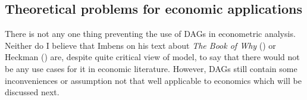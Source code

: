 \documentclass[main=english,12pt,a4paper,pdftex,econ,utf8]{aaltothesis}
\begin{document}
\begin{comment}
For other parts the only thing these articles are taking from DAG framework is the basic structure and way to present the structure which is completely comprehensible with the knowledge provided in the section \ref{section:overview} and equation \ref{eq:lmc}. Also the fact that these are only establishing Granger causality between variables, so analysis is just concentrated on correlations and thus none provides any economic usage of the identification tools that are associated with graphs nor any use for do-calculus. Also as it is not intended to measure actual causality these graphs could not fulfill the completeness requirement of CI in graphs. As an example the Selma Jaytech's paper is only using prince information of stocks and bonds from different countries as determining variables for other countries price variables. It of course could not be adequate model to make complete graph as the international asset markets are not some fully endogenous self defining system, but rather there is some exogenous factors that affecting the movements. All of this might very well be sufficient for the purpose of the study, but at the same time it is making these studies, from the standpoint of graphical models and CI, not that great of an examples for the use of theoretical framework of DAG CI in economics. In other words these papers are using DAGs just as a way to present models visually and the PC algorithm as statistical test for the direction of flow of correlations in time, which makes the model kind of truncated and leaves lot on table for the part of DAG CI. Methods here use the DAG methods only for finding out the structure but not identifying the causality, since this setup is only able to measure Granger causality.
\end{comment}


\subsection{Theoretical problems for economic applications}\label{subsection:problems}

There is not any one thing preventing the use of DAGs in econometric analysis. Neither do I believe that Imbens on his text about \textit{The Book of Why} (\cite{PearlMackenzie18}) or Heckman (\cite{Heckman2015}) are, despite quite critical view of model, to say that there would not be any use cases for it in economic literature. However, DAGs still contain some inconveniences or assumption not that well applicable to economics which will be discussed next.
\end{document}
